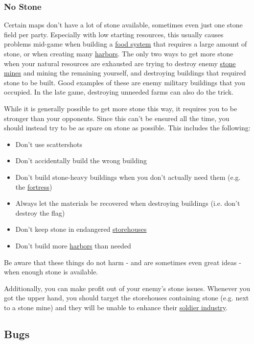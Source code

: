 \documentclass[12pt]{article}
\begin{document}
\subsubsection{No Stone}
\label{sec:nostone}

Certain maps don't have a lot of stone available, sometimes even just one stone field per party. Especially with low starting resources, this usually causes problems mid-game when building a \hyperref[sec:foodsystems]{food system} that requires a large amount of stone, or when creating many \hyperref[sec:harbor]{harbors}. The only two ways to get more stone when your natural resources are exhausted are trying to destroy enemy \hyperref[sec:stonemine]{stone mines} and mining the remaining yourself, and destroying buildings that required stone to be built. Good examples of these are enemy military buildings that you occupied. In the late game, destroying unneeded farms can also do the trick.

While it is generally possible to get more stone this way, it requires you to be stronger than your opponents. Since this can't be ensured all the time, you should instead try to be as spare on stone as possible. This includes the following:

\begin{itemize}
    \item Don't use scattershots
    \item Don't accidentally build the wrong building
    \item Don't build stone-heavy buildings when you don't actually need them (e.g. the \hyperref[sec:fortress]{fortress})
    \item Always let the materials be recovered when destroying buildings (i.e. don't destroy the flag)
    \item Don't keep stone in endangered \hyperref[sec:storehouse]{storehouses}
    \item Don't build more \hyperref[sec:harbor]{harbors} than needed
\end{itemize}

Be aware that these things do not harm - and are sometimes even great ideas - when enough stone is available.

Additionally, you can make profit out of your enemy's stone issues. Whenever you got the upper hand, you should target the storehouses containing stone (e.g. next to a stone mine) and they will be unable to enhance their \hyperref[sec:soldiers]{soldier industry}.

\subsection{Bugs}
\label{sec:bugs}
\end{document}
